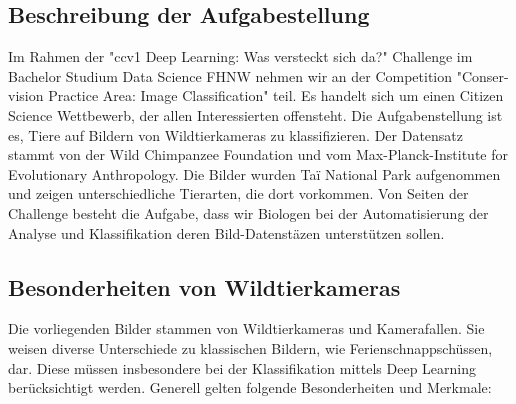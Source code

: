 \documentclass{article}
\begin{document}
\subsection{Beschreibung der Aufgabestellung}
Im Rahmen der "ccv1 Deep Learning: Was versteckt sich da?" Challenge im Bachelor Studium Data Science FHNW nehmen wir an der Competition "Conser-vision Practice Area: Image Classification" teil. Es handelt sich um einen Citizen Science Wettbewerb, der allen Interessierten offensteht. Die Aufgabenstellung ist es, Tiere auf Bildern von Wildtierkameras zu klassifizieren. Der Datensatz stammt von der Wild Chimpanzee Foundation und vom Max-Planck-Institute for Evolutionary Anthropology. Die Bilder wurden Taï National Park aufgenommen und zeigen unterschiedliche Tierarten, die dort vorkommen.
Von Seiten der Challenge besteht die Aufgabe, dass wir Biologen bei der Automatisierung der Analyse und Klassifikation deren Bild-Datenstäzen unterstützen sollen.

\subsection{Besonderheiten von Wildtierkameras}
Die vorliegenden Bilder stammen von Wildtierkameras und Kamerafallen. Sie weisen diverse Unterschiede zu klassischen Bildern, wie Ferienschnappschüssen, dar. Diese müssen insbesondere bei der Klassifikation mittels Deep Learning berücksichtigt werden. Generell gelten folgende Besonderheiten und Merkmale:
\end{document}

